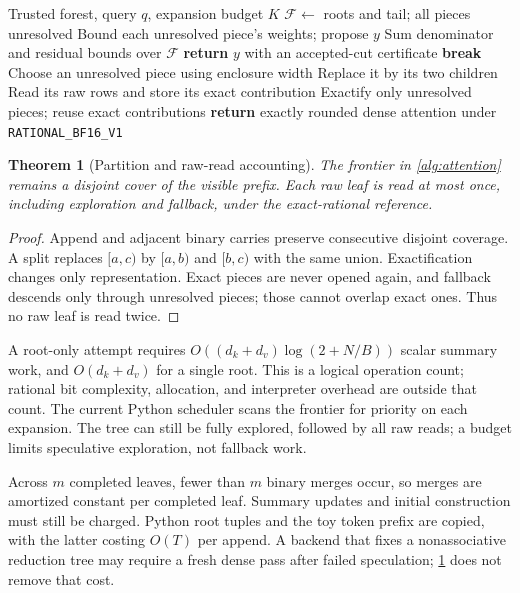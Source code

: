 \documentclass{article}
\theoremstyle{plain}
\newtheorem{theorem}{Theorem}
\theoremstyle{definition}
\theoremstyle{remark}
\newcommand{\profile}{\texttt{RATIONAL\_BF16\_V1}}
\begin{document}
\begin{algorithm}[t]
\caption{Exact attention cut from a disjoint frontier}
\label{alg:attention}
\begin{algorithmic}[1]
\REQUIRE Trusted forest, query $q$, expansion budget $K$
\STATE $\mathcal F\leftarrow$ roots and tail; all pieces unresolved
  \STATE Bound each unresolved piece's weights; propose $y$
  \STATE Sum denominator and residual bounds over $\mathcal F$
    \STATE \textbf{return} $y$ with an accepted-cut certificate
  \ENDIF
    \STATE \textbf{break}
  \ENDIF
  \STATE Choose an unresolved piece using enclosure width
    \STATE Replace it by its two children
  \ELSE
    \STATE Read its raw rows and store its exact contribution
  \ENDIF
\ENDFOR
\STATE Exactify only unresolved pieces; reuse exact contributions
\STATE \textbf{return} exactly rounded dense attention under \profile{}
\end{algorithmic}
\end{algorithm}

\begin{theorem}[Partition and raw-read accounting]
\label{thm:frontier}
The frontier in \cref{alg:attention} remains a disjoint cover of the
visible prefix. Each raw leaf is read at most once, including exploration
and fallback, under the exact-rational reference.
\end{theorem}
\begin{proof}
Append and adjacent binary carries preserve consecutive disjoint coverage.
A split replaces $[a,c)$ by $[a,b)$ and $[b,c)$ with the same union.
Exactification changes only representation. Exact pieces are never opened
again, and fallback descends only through unresolved pieces; those cannot
overlap exact ones. Thus no raw leaf is read twice.
\end{proof}

A root-only attempt requires
$O((d_k+d_v)\log(2+N/B))$ scalar summary work, and
$O(d_k+d_v)$ for a single root. This is a logical operation count;
rational bit complexity, allocation, and interpreter overhead are outside
that count. The current Python scheduler scans the frontier for priority
on each expansion. The tree can still be fully explored, followed by all
raw reads; a budget limits speculative exploration, not fallback work.

Across $m$ completed leaves, fewer than $m$ binary merges occur, so merges
are amortized constant per completed leaf. Summary updates and initial
construction must still be charged. Python root tuples and the toy token
prefix are copied, with the latter costing $O(T)$ per append. A backend
that fixes a nonassociative reduction tree may require a fresh dense pass
after failed speculation; \cref{thm:frontier} does not remove that cost.
\end{document}
